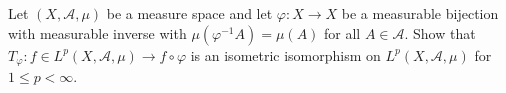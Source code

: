 Let $(X,\mathcal{A},\mu)$ be a measure space and let
$\varphi:X\rightarrow X$ be a measurable bijection with measurable
inverse with $\mu(\varphi^{-1}A)=\mu(A)$ for all $A\in
\mathcal{A}$. Show that $T_{\varphi}:f\in
L^p(X,\mathcal{A},\mu)\rightarrow f\circ \varphi$ is an isometric
isomorphism on $L^p(X,\mathcal{A},\mu)$ for $1\leq p<\infty$.

